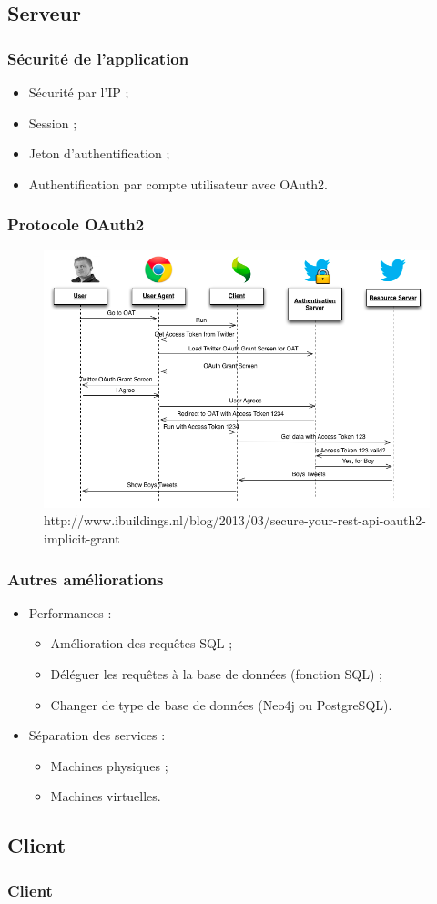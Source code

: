 \subsection{Serveur}
	\begin{frame}
		\frametitle{Sécurité de l'application}
		\begin{itemize}
			\item Sécurité par l'IP ;
			\item Session ;
			\item Jeton d'authentification ;
			\item Authentification par compte utilisateur avec OAuth2.
		\end{itemize}
	\end{frame}

	\begin{frame}
		\frametitle{Protocole OAuth2}
		\begin{figure}[H]
			\centering
			\includegraphics[width=1\textwidth]{images/oauth2.png}
			\caption{http://www.ibuildings.nl/blog/2013/03/secure-your-rest-api-oauth2-implicit-grant}
		\end{figure}

	\end{frame}

	\begin{frame}
		\frametitle{Autres améliorations}
		\begin{itemize}
			\item Performances :
				\begin{itemize}
					\item Amélioration des requêtes SQL ;
					\item Déléguer les requêtes à la base de données (fonction SQL) ;
					\item Changer de type de base de données (Neo4j ou PostgreSQL).
				\end{itemize}
			\item Séparation des services :
				\begin{itemize}
					\item Machines physiques ;
					\item Machines virtuelles.
				\end{itemize}
		\end{itemize}
	\end{frame}

\subsection{Client}
	\begin{frame}
		\frametitle{Client}
	\end{frame}
